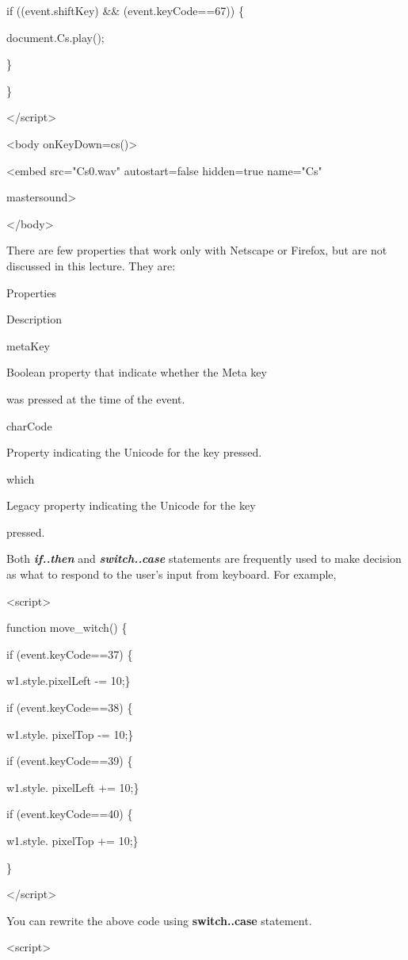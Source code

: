 \documentclass[
]{article}
\begin{document}
if ((event.shiftKey) \&\& (event.keyCode==67)) \{

document.Cs.play();

\}

\}

\textless/script\textgreater{}

\textless body onKeyDown=cs()\textgreater{}

\textless embed src="Cs0.wav" autostart=false hidden=true name="Cs"

mastersound\textgreater{}

\textless/body\textgreater{}

There are few properties that work only with Netscape or Firefox, but
are not discussed in this lecture. They are:

Properties

Description

metaKey

Boolean property that indicate whether the Meta key

was pressed at the time of the event.

charCode

Property indicating the Unicode for the key pressed.

which

Legacy property indicating the Unicode for the key

pressed.

Both \emph{\textbf{if..then}} and \emph{\textbf{switch..case}}
statements are frequently used to make decision as what to respond to
the user's input from keyboard. For example,

\textless script\textgreater{}

function move\_witch() \{

if (event.keyCode==37) \{

w1.style.pixelLeft -= 10;\}

if (event.keyCode==38) \{

w1.style. pixelTop -= 10;\}

if (event.keyCode==39) \{

w1.style. pixelLeft += 10;\}

if (event.keyCode==40) \{

w1.style. pixelTop += 10;\}

\}

\textless/script\textgreater{}

You can rewrite the above code using \textbf{switch..case} statement.

\textless script\textgreater{}
\end{document}
